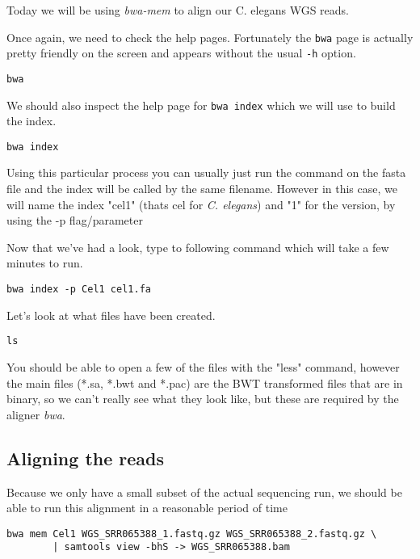 Today we will be using \textit{bwa-mem} to align our C. elegans WGS reads.

\begin{steps}
Once again, we need to check the help pages.
Fortunately the \texttt{bwa} page is actually pretty friendly on the screen and appears without the usual \texttt{-h} option. \\
\begin{lstlisting}
bwa
\end{lstlisting}

We should also inspect the help page for \texttt{bwa index} which we will use to build the index.\\
\begin{lstlisting}
bwa index
\end{lstlisting}
Using this particular process you can usually just run the command on the fasta file and the index will be called by the same filename. However in this case, we will name the index "cel1" (thats cel for \textit{C. elegans}) and "1" for the version, by using the -p flag/parameter
\end{steps}

\begin{steps}
Now that we've had a look, type to following command which will take a few minutes to run.
\begin{lstlisting}
bwa index -p Cel1 cel1.fa
\end{lstlisting}
\end{steps}

\begin{steps}
Let's look at what files have been created.
\begin{lstlisting}
ls
\end{lstlisting}
You should be able to open a few of the files with the "less" command, however the main files (*.sa, *.bwt and *.pac) are the BWT transformed files that are in binary, so we can't really see what they look like, but these are required by the aligner \textit{bwa}.
\end{steps}

\subsection{Aligning the reads}
Because we only have a small subset of the actual sequencing run, we should be able to run this alignment in a reasonable period of time
\begin{lstlisting}
bwa mem Cel1 WGS_SRR065388_1.fastq.gz WGS_SRR065388_2.fastq.gz \
        | samtools view -bhS -> WGS_SRR065388.bam
\end{lstlisting}

